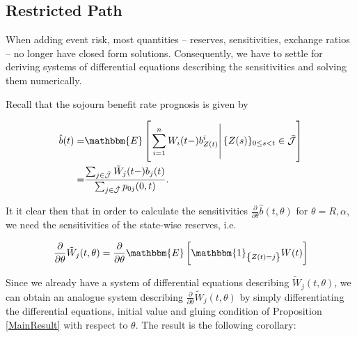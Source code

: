 \documentclass{article}
\newcommand{\1}[1]{\mathbbm{1}_{\left\lbrace #1 \right\rbrace}}
\newcommand{\expec}[1][def]{\mathbbm{E} \left[ #1 \right]}
\newcommand{\econd}[2][def]{\mathbbm{E} \left[ \left. #1 \right| #2 \right]}
\theoremstyle{break}
\theoremstyle{remark}
\numberwithin{equation}{section}
\begin{document}
\newpage
\subsection{Restricted Path} \label{SensRestr}

When adding event risk, most quantities -- reserves, sensitivities, exchange ratios -- no longer have closed form solutions. Consequently, we have to settle for deriving systems of differential equations describing the sensitivities and solving them numerically.

Recall that the sojourn benefit rate prognosis is given by

\begin{align*}
	\hat{b}(t)=& \econd[\sum_{i=1}^n W_i(t-)b_{Z(t)}^i]{\{Z(s) \}_{0 \leq s < t} \in \bar{\mathcal{J}}} \\
	=& \frac{\sum_{j \in \hat{\mathcal{J}}} \tilde{W}_j(t-) b_j(t)}{\sum_{j \in \hat{\mathcal{J}}} p_{0j}(0,t)}.
\end{align*}

It it clear then that in order to calculate the sensitivities $\frac{\partial}{\partial \theta} \hat{b}(t,\theta)$ for $\theta=R,\alpha$, we need the sensitivities of the state-wise reserves, i.e.

\begin{align*}
	\frac{\partial}{\partial \theta} \tilde{W}_j(t,\theta) = \frac{\partial}{\partial \theta} \expec[\1{Z(t)=j} W(t)]
\end{align*}

Since we already have a system of differential equations describing $\tilde{W}_j(t,\theta)$, we can obtain an analogue system describing $\frac{\partial}{\partial \theta} \tilde{W}_j(t,\theta)$ by simply differentiating the differential equations, initial value and gluing condition of Proposition \ref{MainResult} with respect to $\theta$. The result is the following corollary:
\end{document}
